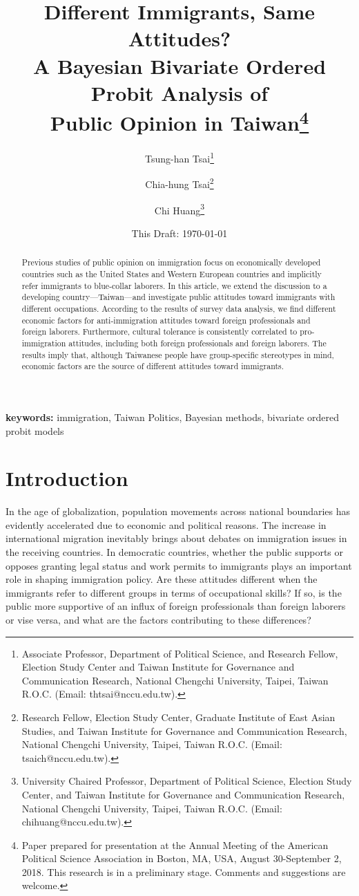\documentclass[12pt]{article}
\title{\renewcommand{\thefootnote}{\fnsymbol{footnote}}
Different Immigrants, Same Attitudes? \\ A Bayesian Bivariate Ordered Probit Analysis of \\ Public Opinion in Taiwan\footnote{Paper prepared for presentation at the Annual Meeting of the American Political Science Association in Boston, MA, USA, August 30-September 2, 2018. This research is in a preliminary stage. Comments and suggestions are welcome.}
}
\author{
Tsung-han Tsai\footnote{Associate Professor, Department of Political Science, and Research Fellow, Election Study Center and Taiwan Institute for Governance and Communication Research, National Chengchi University, Taipei, Taiwan R.O.C. (Email: thtsai@nccu.edu.tw).}
\and
Chia-hung Tsai\footnote{Research Fellow, Election Study Center, Graduate Institute of East Asian Studies, and Taiwan Institute for Governance and Communication Research, National Chengchi University, Taipei, Taiwan R.O.C. (Email: tsaich@nccu.edu.tw).}
\and
Chi Huang\footnote{University Chaired Professor, Department of Political Science, Election Study Center, and Taiwan Institute for Governance and Communication Research, National Chengchi University, Taipei, Taiwan R.O.C. (Email: chihuang@nccu.edu.tw).}
}
\date{
This Draft: \today
}        %
\begin{document}
\doublespace


\maketitle

\thispagestyle{empty}



\begin{abstract}
Previous studies of public opinion on immigration focus on economically developed countries such as the United States and Western European countries and implicitly refer immigrants to blue-collar laborers. In this article, we extend the discussion to a developing country---Taiwan---and investigate public attitudes toward immigrants with different occupations. According to the results of survey data analysis, we find different economic factors for anti-immigration attitudes toward foreign professionals and foreign laborers. Furthermore, cultural tolerance is consistently correlated to pro-immigration attitudes, including both foreign professionals and foreign laborers. The results imply that, although Taiwanese people have group-specific stereotypes in mind, economic factors are the source of different attitudes toward immigrants.
\end{abstract}



\textbf{keywords:} immigration, Taiwan Politics, Bayesian methods, bivariate ordered probit models



\newpage


\setcounter{page}{1}



\section{Introduction}


In the age of globalization, population movements across national boundaries has evidently accelerated due to economic and political reasons. The increase in international migration inevitably brings about debates on immigration issues in the receiving countries. In democratic countries, whether the public supports or opposes granting legal status and work permits to immigrants plays an important role in shaping immigration policy. Are these attitudes different when the immigrants refer to different groups in terms of occupational skills? If so, is the public more supportive of an influx of foreign professionals than foreign laborers or vise versa, and what are the factors contributing to these differences? 
\end{document}
